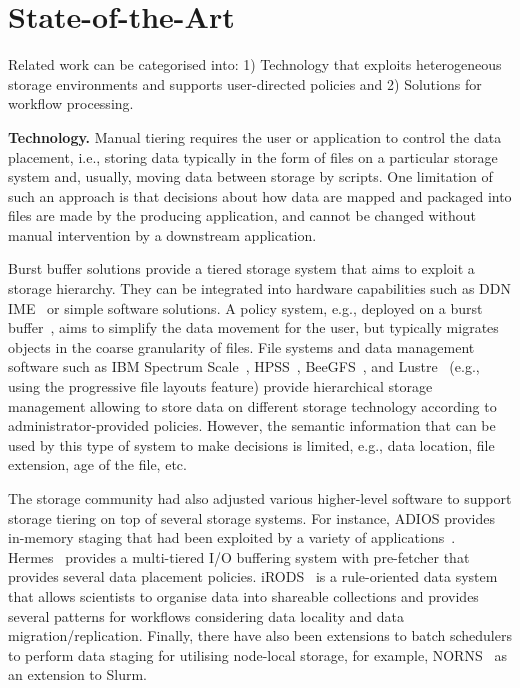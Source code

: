 \documentclass{superfri}
\begin{document}
\section{State-of-the-Art}
\label{sec:art}

Related work can be categorised into:
1) Technology that exploits heterogeneous storage environments and supports user-directed policies and
2) Solutions for workflow processing.

\textbf{Technology.}
Manual tiering requires the user or application to control the data placement, i.e., storing data typically in the form of files on a particular storage system and, usually, moving data between storage by scripts.
One limitation of such an approach is that decisions about how data are mapped and packaged into files are made by the producing application, and cannot be changed without manual intervention by a downstream application.

Burst buffer solutions provide a tiered storage system that aims to exploit a storage hierarchy.
They can be integrated into hardware capabilities such as DDN IME~\cite{BODIAIFSFI19} or simple software solutions.
A policy system, e.g., deployed on a burst buffer~\cite{RomanusRP15}, aims to simplify the data movement for the user, but typically migrates objects in the coarse granularity of files.
File systems and data management software such as IBM Spectrum Scale~\cite{SchmuckH02}, HPSS~\cite{528214}, BeeGFS~\cite{beegfs}, and Lustre~\cite{abs-1903-01955} (e.g., using the progressive file layouts feature) provide hierarchical storage management allowing to store data on different storage technology according to administrator-provided policies.
However, the semantic information that can be used by this type of system to make decisions is limited, e.g., data location, file extension, age of the file, etc.

The storage community had also adjusted various higher-level software to support storage tiering on top of several storage systems. For instance, ADIOS provides in-memory staging that had been exploited by a variety of applications~\cite{slawinska2013maya}.
Hermes~\cite{kougkas2020acceleration} provides a multi-tiered I/O buffering system with pre-fetcher that provides several data placement policies.
iRODS~\cite{rajasekar2010irods} is a rule-oriented data system that allows scientists to organise data into shareable collections and provides several patterns for workflows considering data locality and data migration/replication.
Finally, there have also been extensions to batch schedulers to perform data staging for utilising node-local storage, for example, NORNS~\cite{miranda2019norns} as an extension to Slurm.
\end{document}
